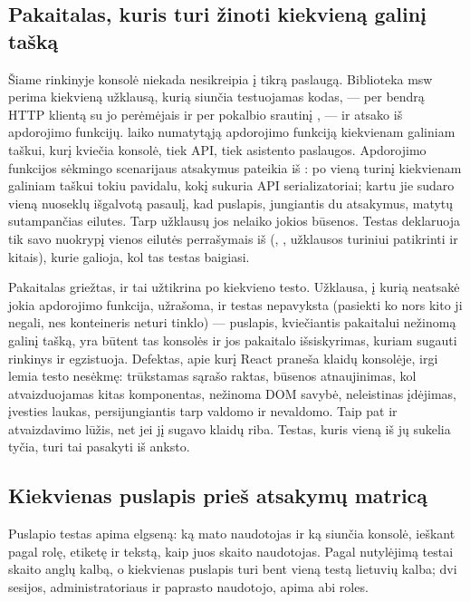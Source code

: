 \subsection{Pakaitalas, kuris turi žinoti kiekvieną galinį tašką}\label{sec:testing:console:double}

Šiame rinkinyje konsolė niekada nesikreipia į tikrą paslaugą. Biblioteka msw perima kiekvieną
užklausą, kurią siunčia testuojamas kodas, --- per bendrą HTTP klientą su jo perėmėjais ir per
pokalbio srautinį , --- ir atsako iš apdorojimo funkcijų.
 laiko numatytąją apdorojimo funkciją kiekvienam galiniam
taškui, kurį kviečia konsolė, tiek API, tiek asistento paslaugos. Apdorojimo funkcijos sėkmingo
scenarijaus atsakymus pateikia iš : po vieną turinį kiekvienam galiniam
taškui tokiu pavidalu, kokį sukuria API serializatoriai; kartu jie sudaro vieną nuoseklų
išgalvotą pasaulį, kad puslapis, jungiantis du atsakymus, matytų sutampančias eilutes. Tarp
užklausų jos nelaiko jokios būsenos. Testas deklaruoja tik savo nuokrypį vienos eilutės
 perrašymais iš  (,
,  užklausos turiniui patikrinti ir kitais), kurie galioja,
kol tas testas baigiasi.

Pakaitalas griežtas, ir  tai užtikrina po kiekvieno testo.
Užklausa, į kurią neatsakė jokia apdorojimo funkcija, užrašoma, ir testas nepavyksta (pasiekti
ko nors kito ji negali, nes konteineris neturi tinklo) --- puslapis, kviečiantis pakaitalui
nežinomą galinį tašką, yra būtent tas konsolės ir jos pakaitalo išsiskyrimas, kuriam sugauti
rinkinys ir egzistuoja. Defektas, apie kurį React praneša klaidų konsolėje, irgi lemia testo
nesėkmę: trūkstamas sąrašo raktas, būsenos atnaujinimas, kol atvaizduojamas kitas komponentas,
nežinoma DOM savybė, neleistinas įdėjimas, įvesties laukas, persijungiantis tarp valdomo ir
nevaldomo. Taip pat ir atvaizdavimo lūžis, net jei jį sugavo klaidų riba. Testas, kuris vieną iš
jų sukelia tyčia, turi tai pasakyti iš anksto.

\subsection{Kiekvienas puslapis prieš atsakymų matricą}\label{sec:testing:console:matrix}

Puslapio testas apima elgseną: ką mato naudotojas ir ką siunčia konsolė, ieškant pagal rolę,
etiketę ir tekstą, kaip juos skaito naudotojas. Pagal nutylėjimą testai skaito anglų kalbą, o
kiekvienas puslapis turi bent vieną testą lietuvių kalba; dvi 
sesijos, administratoriaus ir paprasto naudotojo, apima abi roles.

